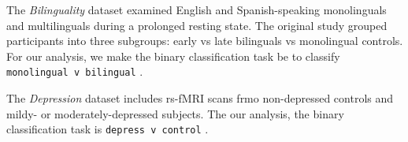 \documentclass[12pt]{spieman}  %
\newcommand{\code}[1]{\small \texttt{#1} \normalsize}
\begin{document}
\begin{spacing}{2}

The \textit{Bilinguality} dataset\cite{ds001747:1.0.0,
goldcarrieelizabethExploringRestingState2018} examined English and
Spanish-speaking monolinguals and multilinguals during a prolonged resting
state. The original study grouped participants into three subgroups: early vs
late bilinguals vs monolingual
controls\cite{goldcarrieelizabethExploringRestingState2018}. For our analysis,
we make the binary classification task be to classify \code{monolingual v
bilingual}.



The \textit{Depression} dataset\cite{bezmaternykhddRestingStateClosed2021,
bezmaternykhBrainNetworksConnectivity2021} includes rs-fMRI scans frmo
non-depressed controls and mildy- or moderately-depressed subjects. The our analysis,
the binary classification task is \code{depress v control}.




\end{spacing}
\end{document}
